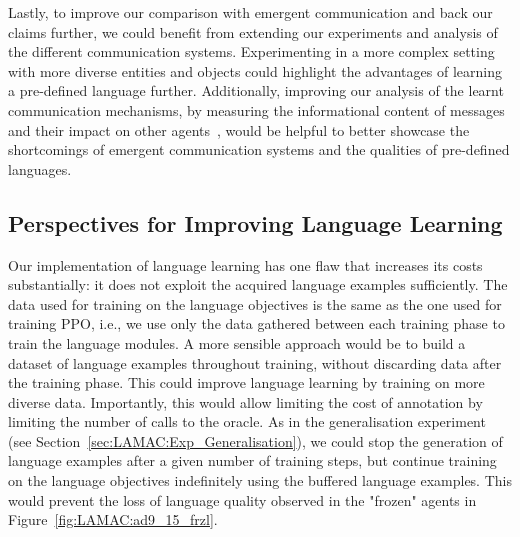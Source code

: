 Lastly, to improve our comparison with emergent communication and back our claims further, we could benefit from extending our experiments and analysis of the different communication systems. Experimenting in a more complex setting with more diverse entities and objects could highlight the advantages of learning a pre-defined language further. Additionally, improving our analysis of the learnt communication mechanisms, by measuring the informational content of messages and their impact on other agents~\citep{Lowe2019_Pitfalls, Jaques2019_SocialInfluence}, would be helpful to better showcase the shortcomings of emergent communication systems and the qualities of pre-defined languages.









\subsection{Perspectives for Improving Language Learning}\label{sec:LAMAC:Discuss_LangImprov}

Our implementation of language learning has one flaw that increases its costs substantially: it does not exploit the acquired language examples sufficiently. The data used for training on the language objectives is the same as the one used for training PPO, i.e., we use only the data gathered between each training phase to train the language modules. A more sensible approach would be to build a dataset of language examples throughout training, without discarding data after the training phase. This could improve language learning by training on more diverse data. Importantly, this would allow limiting the cost of annotation by limiting the number of calls to the oracle. As in the generalisation experiment (see Section~\ref{sec:LAMAC:Exp_Generalisation}), we could stop the generation of language examples after a given number of training steps, but continue training on the language objectives indefinitely using the buffered language examples. This would prevent the loss of language quality observed in the "frozen" agents in Figure~\ref{fig:LAMAC:ad9_15_frzl}. 

